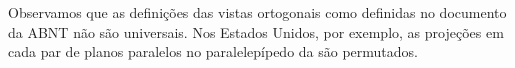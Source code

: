 \begin{observation}{}


Observamos que as definições das vistas ortogonais como definidas no documento da ABNT não são universais. Nos Estados Unidos, por exemplo, as projeções em cada par de planos paralelos no paralelepípedo da {\hyperref[\detokenize{GE301-6:fig-proj-vistas-ortogonais-06}]{}} são permutados.
\end{observation}

